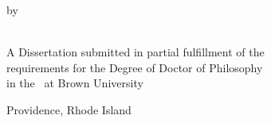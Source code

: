\thispagestyle{empty}


\begin{center}
\huge\bfseries 
\thesistitle
\end{center}
  \vfill
  \begin{center}%
    by\\
\myname \\
    \degrees
  \end{center}
  \vfill
  \begin{center}
    A Dissertation submitted in partial fulfillment of the\\
    requirements for the Degree of Doctor of Philosophy\\
    in the \department~at Brown University
  \end{center}
  \vfill
  \begin{center}
    Providence, Rhode Island\\
    \thesismonth~\thesisyear
  \end{center}
